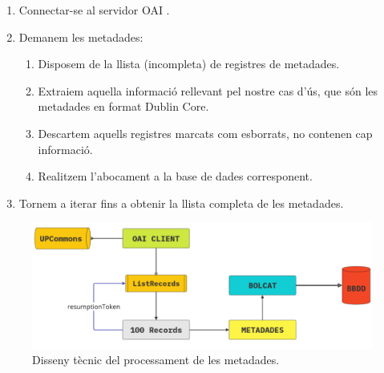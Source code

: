 \begin{enumerate}
    \item Connectar-se al servidor OAI .
    \item Demanem les metadades:
    \begin{enumerate}
        \item Disposem de la llista (incompleta) de registres de metadades.
        \item Extraiem aquella informació rellevant pel nostre cas d'ús, que són les metadades en format Dublin Core.
        \item Descartem aquells registres marcats com esborrats, no contenen cap informació.
        \item Realitzem l'abocament a la base de dades corresponent.
    \end{enumerate}
    \item Tornem a iterar fins a obtenir la llista completa de les metadades.
\end{enumerate}

\begin{figure}[htbp]
    \centerline{\includegraphics[width=1.2\textwidth]{figures/metadata-processing}}
    \captionsetup{justification=centering}
    \caption{Disseny tècnic del processament de les metadades.}\label{fig:log-analysis}
\end{figure}

